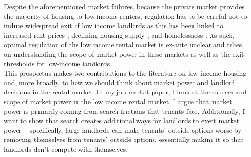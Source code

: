 \documentclass{article}
\begin{document}
Despite the aforementioned market failures, because the private market provides the majority of housing to low income renters, regulation has to be careful not to induce widespread exit of low income landlords as this has been linked to increased rent prices \parencite{collinson2024eviction}, declining housing supply \parencite{diamond-2019}, and homelessness \parencite{pinto2024sro}. As such, optimal regulation of the low income rental market is ex-ante unclear and relies on understanding the scope of market power in these markets as well as the exit thresholds for low-income landlords.\\   

This prospectus makes two contributions to the literature on low income housing and, more broadly, to how we should think about market power and landlord decisions in the rental market. In my job market paper, I look at the sources and scope of market power in the low income rental market. I argue that market power is primarily coming from search frictions that tenants face. Additionally, I want to show that search creates additional ways for landlords to exert market power -- specifically, large landlords can make tenants' outside options worse by removing themselves from tenants' outside options, essentially making it so that landlords don't compete with themselves.

\end{document}
